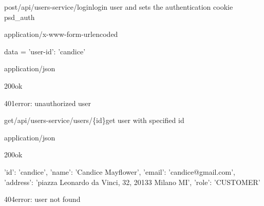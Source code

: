\begin{apiRoute}{post}{/api/users-service/login}{login user and sets the authentication cookie psd\_auth}
	\begin{routeParameter}
	\end{routeParameter}
	\begin{routeRequest}{application/x-www-form-urlencoded}
		\begin{routeRequestBody}
data = {
    'user-id': 'candice'
    }
		\end{routeRequestBody}
	\end{routeRequest}
	\begin{routeResponse}{application/json}
    	\begin{routeResponseItem}{200}{ok}
    	    \begin{routeResponseItemBody}
			\end{routeResponseItemBody}
    	\end{routeResponseItem}
    	\begin{routeResponseItem}{401}{error: unauthorized user}
    	    \begin{routeResponseItemBody}
			\end{routeResponseItemBody}
    	\end{routeResponseItem}
	\end{routeResponse}
\end{apiRoute}

\begin{apiRoute}{get}{/api/users-service/users/\{id\}}{get user with specified id}
	\begin{routeParameter}
		\routeParamItem{id}{id of the user}
	\end{routeParameter}
	\begin{routeResponse}{application/json}
		\begin{routeResponseItem}{200}{ok}
			\begin{routeResponseItemBody}
{
    'id': 'candice',
    'name': 'Candice Mayflower',
    'email': 'candice@gmail.com',
    'address': 'piazza Leonardo da Vinci, 32, 20133 Milano MI',
    'role': 'CUSTOMER'
}
			\end{routeResponseItemBody}
		\end{routeResponseItem}
		\begin{routeResponseItem}{404}{error: user not found}
		    \begin{routeResponseItemBody}
			\end{routeResponseItemBody}
		\end{routeResponseItem}
	\end{routeResponse}
\end{apiRoute}

